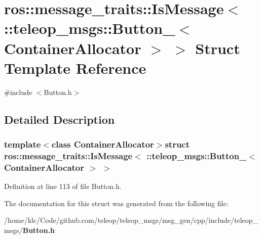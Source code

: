 \section{ros::message\_\-traits::IsMessage$<$ ::teleop\_\-msgs::Button\_\-$<$ ContainerAllocator $>$ $>$ Struct Template Reference}
\label{structros_1_1message__traits_1_1IsMessage_3_01_1_1teleop__msgs_1_1Button___3_01ContainerAllocator_01_4_01_4}


{\ttfamily \#include $<$Button.h$>$}



\subsection{Detailed Description}
\subsubsection*{template$<$class ContainerAllocator$>$struct ros::message\_\-traits::IsMessage$<$ ::teleop\_\-msgs::Button\_\-$<$ ContainerAllocator $>$ $>$}



Definition at line 113 of file Button.h.



The documentation for this struct was generated from the following file:\begin{DoxyCompactItemize}
\item 
/home/klc/Code/github.com/teleop/teleop\_\-msgs/msg\_\-gen/cpp/include/teleop\_\-msgs/{\bf Button.h}\end{DoxyCompactItemize}
